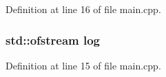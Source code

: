 Definition at line 16 of file main.\+cpp.

\subsubsection[{log}]{\setlength{\rightskip}{0pt plus 5cm}std\+::ofstream log}\label{main_8hpp_a32def6abcbf45dc4ffc6bf743fc9bb61}


Definition at line 15 of file main.\+cpp.


